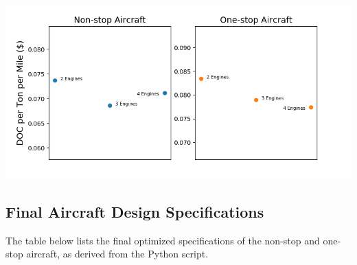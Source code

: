\documentclass{article}
\begin{document}
        \begin{center}
            \includegraphics[scale=0.7]{engines.PNG}
            \label{fig:engine}%
        \end{center}


    \subsection{Final Aircraft Design Specifications}
    \label{sec:optimized}

        \begin{flushleft}
            The table below lists the final optimized specifications of the
            non-stop and one-stop aircraft, as derived from the Python script.
        \end{flushleft}
\end{document}

